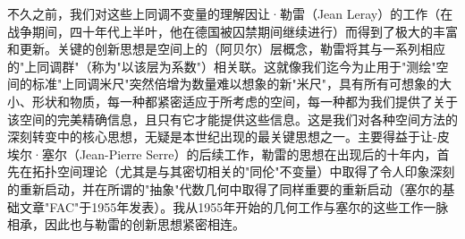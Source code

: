 不久之前，我们对这些上同调不变量的理解因让·勒雷（Jean Leray）的工作（在战争期间，四十年代上半叶，他在德国被囚禁期间继续进行）而得到了极大的丰富和更新。关键的创新思想是空间上的（阿贝尔）层概念，勒雷将其与一系列相应的"上同调群"（称为"以该层为系数"）相关联。这就像我们迄今为止用于"测绘"空间的标准"上同调米尺"突然倍增为数量难以想象的新"米尺"，具有所有可想象的大小、形状和物质，每一种都紧密适应于所考虑的空间，每一种都为我们提供了关于该空间的完美精确信息，且只有它才能提供这些信息。这是我们对各种空间方法的深刻转变中的核心思想，无疑是本世纪出现的最关键思想之一。主要得益于让-皮埃尔·塞尔（Jean-Pierre Serre）的后续工作，勒雷的思想在出现后的十年内，首先在拓扑空间理论（尤其是与其密切相关的"同伦"不变量）中取得了令人印象深刻的重新启动，并在所谓的"抽象"代数几何中取得了同样重要的重新启动（塞尔的基础文章"FAC"于1955年发表）。我从1955年开始的几何工作与塞尔的这些工作一脉相承，因此也与勒雷的创新思想紧密相连。
